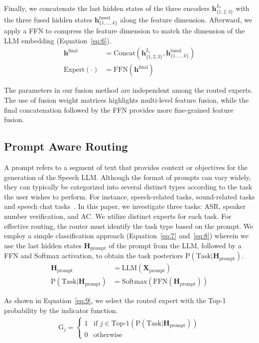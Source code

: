 \noindent Finally, we concatenate the last hidden states of the three encoders $\mathbf{h}_{\{1,2,3\}}^{L_i}$ with the three fused hidden states $\mathbf{h}_{\{1,\ldots,k\}}^\text{fused}$ along the feature dimension. Afterward, we apply a FFN to compress the feature dimension to match the dimension of the LLM embedding (Equation~\ref{eq:6}).
\begin{align}
 \label{eq:6}
 \mathbf{h}^{\text{final}} &= \text{Concat}(\mathbf{h}_{\{1,2,3\}}^{L_i}, \mathbf{h}_{\{1,\ldots,k\}}^\text{fused}) \nonumber \\ 
 \text{Expert}(\cdot) &= \text{FFN}(\mathbf{h}^{\text{final}})
\end{align}

\noindent The parameters in our fusion method are independent among the routed experts. The use of fusion weight matrices highlights multi-level feature fusion, while the final concatenation followed by the FFN provides more fine-grained feature fusion.

\subsection{Prompt Aware Routing}

A prompt refers to a segment of text that provides context or objectives for the generation of the Speech LLM. Although the format of prompts can vary widely, they can typically be categorized into several distinct types according to the task the user wishes to perform. For instance, speech-related tasks, sound-related tasks and speech chat tasks~\cite{yang2024air}. In this paper, we investigate three tasks: ASR, speaker number verification, and AC. We utilize distinct experts for each task. For effective routing, the router must identify the task type based on the prompt. We employ a simple classification approach (Equation~\ref{eq:7} and~\ref{eq:8}) wherein we use the last hidden states $\mathbf{H}_\text{prompt}$ of the prompt from the LLM, followed by a FFN and Softmax activation, to obtain the task posteriors $\text{P}(\text{Task}|\mathbf{H}_\text{prompt})$.
\begin{align}
 \label{eq:7}
 \mathbf{H}_\text{prompt} &= \text{LLM}(\mathbf{X}_\text{prompt})\\ 
 \label{eq:8}
 \text{P}(\text{Task}|\mathbf{H}_\text{prompt}) &= \text{Softmax}(\text{FFN} (\mathbf{H}_\text{prompt}))
\end{align}

\noindent As shown in Equation~\ref{eq:9}, we select the routed expert with the Top-1 probability by the indicator function.
\begin{align}
 \label{eq:9}
 \text{G}_j = 
 \begin{cases}
 1 & \text{if } j\in\text{Top-1}(\text{P}(\text{Task}|\mathbf{H}_\text{prompt}))\\
 0 & \text{otherwise}
 \end{cases}
\end{align}

